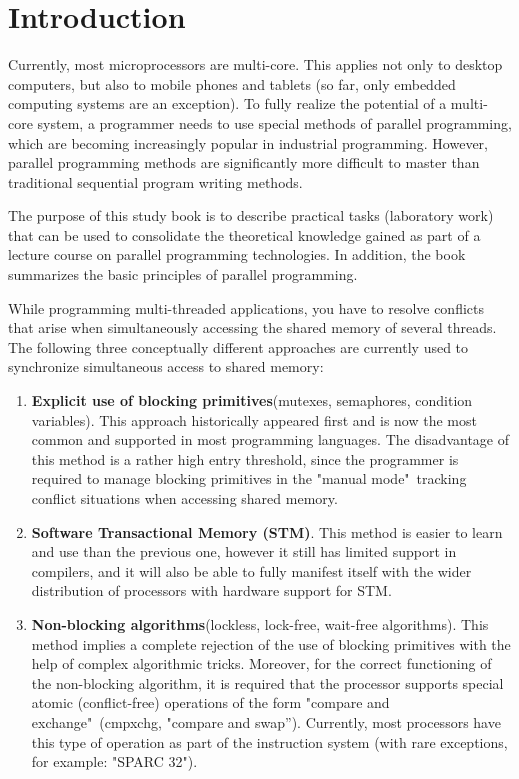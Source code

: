 { %
	\section*{Introduction}
	\par Currently, most microprocessors are multi-core. This applies not only to desktop computers, but also to mobile phones and tablets (so far, only embedded computing systems are an exception). To fully realize the potential of a multi-core system, a programmer needs to use special methods of parallel programming, which are becoming increasingly popular in industrial programming. However, parallel programming methods are significantly more difficult to master than traditional sequential program writing methods.
	\par The purpose of this study book is to describe practical tasks (laboratory work) that can be used to consolidate the theoretical knowledge gained as part of a lecture course on parallel programming technologies. In addition, the book summarizes the basic principles of parallel programming.%
	\par While programming multi-threaded applications, you have to resolve conflicts that arise when simultaneously accessing the shared memory of several threads. The following three conceptually different approaches are currently used to synchronize simultaneous access to shared memory:
	\begin{enumerate}
		\item\textbf{Explicit use of blocking primitives}\quad(mutexes, semaphores, condition variables). This approach historically appeared first and is now the most common and supported in most programming languages. The disadvantage of this method is a rather high entry threshold, since the programmer is required to manage blocking primitives in the  "manual mode"\, tracking conflict situations when accessing shared memory.
		\item\textbf{Software Transactional Memory (STM)}. This method is easier to learn and use than the previous one, however it still has limited support in compilers, and it will also be able to fully manifest itself with the wider distribution of processors with hardware support for STM.
		\item\textbf{Non-blocking algorithms}\quad(lockless, lock-free, wait-free algorithms). This method implies a complete rejection of the use of blocking primitives with the help of complex algorithmic tricks. Moreover, for the correct functioning of the non-blocking algorithm, it is required that the processor supports special atomic (conflict-free) operations of the form "compare and exchange"\ (cmpxchg, "compare and swap''). Currently, most processors have this type of operation as part of the instruction system (with rare exceptions, for example: "SPARC 32"{}).

\end{enumerate}}
